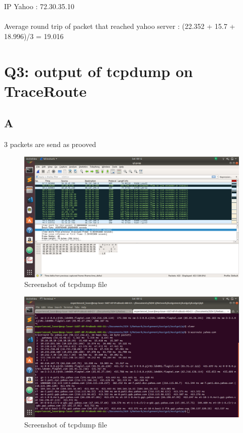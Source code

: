 \documentclass{article}
\begin{document}
IP Yahoo : 72.30.35.10 \\
\\
Average round trip of packet that reached yahoo server : (22.352 + 15.7 + 18.996)/3 = 19.016
\section{Q3: output of tcpdump on TraceRoute}
\subsection{A}
3 packets are send as prooved \\
  \begin{figure}[H]
 \centering
 \includegraphics[width=1.0\textwidth]{Assign3/q3/q31wireshark.png}
 \caption{\label{fig:PING}Screenshot of tcpdump file}
 \end{figure}
   
   \begin{figure}[H]
 \centering
 \includegraphics[width=1.0\textwidth]{Assign3/q3/q31terminal.png}
 \caption{\label{fig:PING}Screenshot of tcpdump file}
 \end{figure}
 
\end{document}

